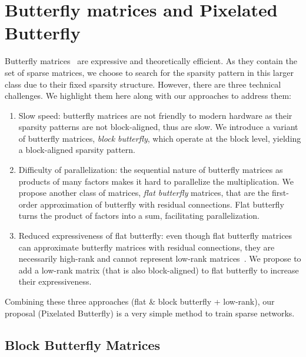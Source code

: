 \vspace{-0.1cm}
\section{Butterfly matrices and Pixelated Butterfly}
\label{sec:butterfly}



Butterfly matrices~\citep{parker1995random, dao2019learning} are expressive
and theoretically efficient.
As they contain the set of sparse matrices, we choose to search for the sparsity
pattern in this larger class due to their fixed sparsity structure.
However, there are three technical challenges.
We highlight them here along with our approaches to address them:
\begin{enumerate}[leftmargin=*,nosep,nolistsep]
  \item Slow speed: butterfly matrices are not friendly to modern hardware as their
  sparsity patterns are not block-aligned, thus are slow.
  We introduce a variant of butterfly matrices, \emph{block butterfly}, which operate at the block level, yielding
  a block-aligned sparsity pattern.
  \item Difficulty of parallelization: the sequential nature of butterfly matrices as products
  of many factors makes it hard to parallelize the multiplication.
  We propose another class of matrices, \emph{flat butterfly} matrices, that are
  the first-order approximation of butterfly with residual connections.
  Flat butterfly turns the product of factors into a sum, facilitating parallelization.
  \item Reduced expressiveness of flat butterfly: even though flat butterfly
  matrices can approximate butterfly matrices with residual connections, they are
  necessarily high-rank and cannot represent low-rank matrices~\citep{udell2019big}.
  We propose to add a low-rank matrix (that is also block-aligned) to flat
  butterfly to increase their expressiveness.
\end{enumerate}
Combining these three approaches (flat \& block butterfly + low-rank), our
proposal (Pixelated Butterfly) is a very simple method to train sparse networks.

\subsection{Block Butterfly Matrices}
\label{sec:block_butterfly}




